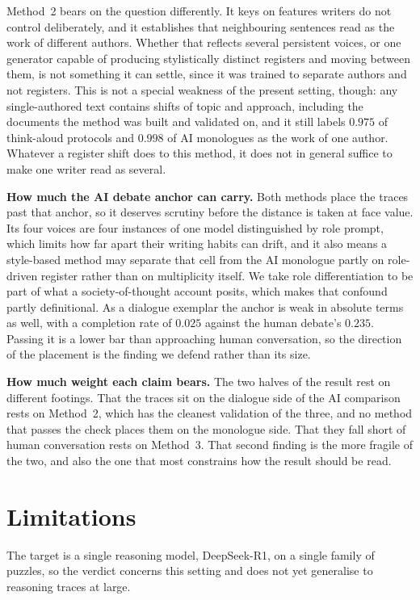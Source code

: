 \documentclass[10pt,twocolumn]{article}
\begin{document}
Method~2 bears on the question differently. It keys on features writers do not control deliberately,
and it establishes that neighbouring sentences read as the work of different authors. Whether that
reflects several persistent voices, or one generator capable of producing stylistically distinct
registers and moving between them, is not something it can settle, since it was trained to separate
authors and not registers. This is not a special weakness of the present setting, though: any
single-authored text contains shifts of topic and approach, including the documents the method was
built and validated on, and it still labels $0.975$ of think-aloud protocols and $0.998$ of AI
monologues as the work of one author. Whatever a register shift does to this method, it does not in
general suffice to make one writer read as several.

\textbf{How much the AI debate anchor can carry.} Both methods place the traces past that anchor, so
it deserves scrutiny before the distance is taken at face value. Its four voices are four instances
of one model distinguished by role prompt, which limits how far apart their writing habits can drift,
and it also means a style-based method may separate that cell from the AI monologue partly on
role-driven register rather than on multiplicity itself. We take role differentiation to be part of
what a society-of-thought account posits, which makes that confound partly definitional. As a
dialogue exemplar the anchor is weak in absolute terms as well, with a completion rate of $0.025$
against the human debate's $0.235$. Passing it is a lower bar than approaching human conversation, so
the direction of the placement is the finding we defend rather than its size.

\textbf{How much weight each claim bears.} The two halves of the result rest on different footings.
That the traces sit on the dialogue side of the AI comparison rests on Method~2, which has the
cleanest validation of the three, and no method that passes the check places them on the monologue
side. That they fall short of human conversation rests on Method~3. That second finding is the more
fragile of the two, and also the one that most constrains how the result should be read.

\section{Limitations}
The target is a single reasoning model, DeepSeek-R1, on a single family of puzzles, so the verdict
concerns this setting and does not yet generalise to reasoning traces at large.
\end{document}
